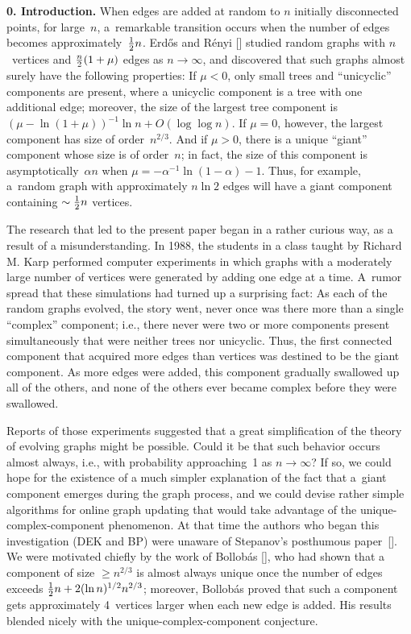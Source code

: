 \bigskip
\noindent
{\bf 0. Introduction.}\enspace
When edges are added at random to $n$ initially disconnected points, for large~$n$,
a~remarkable transition occurs when the number of edges becomes 
approximately~${1\over2} n$. Erd{\H o}s and R\'enyi [\ER]
studied random graphs with $n$~vertices and ${n\over 2}(1+\mu)$ edges
as $n\to\infty$, and discovered that such graphs almost surely have the
following properties: If $\mu<0$, only small
trees and ``unicyclic'' components
are present, where a unicyclic component is a tree with one additional edge;
moreover, the size of the largest tree 
component is ${(\mu-\ln(1+\mu))^{-1}}\ln n
+O(\log\log n)$. If $\mu =0$, however, the largest component has size 
of order~$n^{2/3}$. And if $\mu >0$, there is a unique ``giant'' component
whose size is of order~$n$; in fact, the size  of this component is
asymptotically~$\alpha n$ when $\mu =-\alpha^{-1}\ln(1-\alpha)-1$. 
Thus, for example, a~random graph with approximately $n\ln 2$ edges will have
a giant component containing $\sim{1\over2} n$ vertices.

The research that led to the present paper began in a rather curious
way, as a result of a misunderstanding. In 1988, the students in a class
taught by Richard M. Karp  performed computer experiments in which
graphs with a moderately large number of vertices were generated by adding
one edge at a time. A~rumor spread that these simulations had 
turned up a surprising fact: As each of the
random graphs evolved, the story went, 
never once was there more than a single ``complex''
component; i.e., there never were two or more components present simultaneously
that were neither trees nor unicyclic.
Thus, the first connected component that acquired more edges than vertices was
destined to be the giant component. As more edges were added, this component
gradually swallowed up all of the others, and none of the others ever became
complex before they were swallowed.

Reports of those experiments suggested that a great simplification of
the theory of evolving graphs might be possible.  Could it be that
such behavior occurs almost always, i.e., with probability
approaching~1 as $n\to\infty$? If so, we could hope for the existence
of a much simpler explanation of the fact that a~giant component
emerges during the graph process, and we could devise rather simple
algorithms for online graph updating that would take advantage of the
unique-complex-component phenomenon.  At that time the authors who
began this investigation (DEK and BP) were unaware of Stepanov's
posthumous paper~[\Sii]. We were motivated chiefly by the work of
Bollob\'as [\Bii], who had shown that a component of size $\geq n^{2/3}$
is almost always unique once the number of edges exceeds ${1\over2} 
n+2(\ln n)^{1/2}n^{2/3}$; moreover, Bollob\'as proved that such a
component gets approximately 4~vertices larger when each new edge is
added.  His results blended nicely with the unique-complex-component
conjecture.

